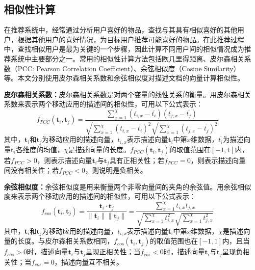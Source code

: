 \subsection{相似性计算}
在推荐系统中，经常通过分析用户喜好的物品，查找与其具有相似喜好的其他用户，根据其他用户的喜好情况，为目标用户推荐可能喜好的物品。在此推荐过程中，查找相似用户是最为关键的一个步骤，因此计算不同用户间的相似情况成为推荐系统中主要部分之一。常用的相似性计算方法包括欧几里得距离、皮尔森相关系数（PCC: Pearson Correlation Coefficient）\cite{pearson1895note}、余弦相似度（Cosine Similarity）等。本文分别使用皮尔森相关系数和余弦相似度对描述文档的向量计算相似性。

\textbf{皮尔森相关系数：}皮尔森相关系数是对两个变量的线性关系的衡量。用皮尔森相关系数来表示两个移动应用的描述间的相似性，可用以下公式表示：
\begin{equation}
f_{\mathit{PCC}}(\mathbf{t}_i, \mathbf{t}_j) 
= \frac{\sum_{x=1}^\chi (t_{i,x} - \overline{t_i})(t_{j,x} - \overline{t_j})}{\sqrt{\sum_{x=1}^\chi (t_{i,x} - \overline{t_i})^2}\sqrt{\sum_{x=1}^\chi (t_{j,x} - \overline{t_j})^2}}
\end{equation}
其中，$\mathbf{t}_i$和$\mathbf{t}_j$为移动应用的描述向量，$t_{i,x}$表示描述向量$\mathbf{t}_i$中第$x$维数据，$\overline{t_i}$为描述向量$\mathbf{t}_i$各维度的均值，$\chi$是描述向量的长度。$f_{\mathit{PCC}}(\mathbf{t}_i, \mathbf{t}_j)$的取值范围在$[-1,1]$内，若$f_{\mathit{PCC}}>0$，则表示描述向量$\mathbf{t}_i$与$\mathbf{t}_j$具有正相关性；若$f_{\mathit{PCC}}=0$，则表示描述向量间没有相关性；若$f_{\mathit{PCC}}<0$，则说明是负相关。

\textbf{余弦相似度：}余弦相似度是用来衡量两个非零向量间的夹角的余弦值。用余弦相似度来表示两个移动应用的描述间的相似性，可用以下公式表示：
\begin{equation}
f_{\mathit{cos}}(\mathbf{t}_i, \mathbf{t}_j) 
= \frac{\mathbf{t}_i \cdot \mathbf{t}_j}{\parallel \mathbf{t}_i \parallel \parallel \mathbf{t}_j \parallel}
= \frac{\sum_{x=1}^\chi t_{i,x}t_{j,x}}{\sqrt{\sum_{x=1}^\chi t_{i,x}^2}\sqrt{\sum_{x=1}^\chi t_{j,x}^2}}
\end{equation}
其中，$\mathbf{t}_i$和$\mathbf{t}_j$为移动应用的描述向量，$t_{i,x}$表示描述向量$\mathbf{t}_i$中第$x$维数据，$\chi$是描述向量的长度。与皮尔森相关系数相同，$f_{\mathit{cos}}(\mathbf{t}_i, \mathbf{t}_j)$的取值范围也在$[-1,1]$内，且当$f_{\mathit{cos}}>0$时，描述向量$\mathbf{t}_i$与$\mathbf{t}_j$呈现正相关性；当$f_{\mathit{cos}}<0$时，描述向量$\mathbf{t}_i$与$\mathbf{t}_j$呈现负相关性；当$f_{\mathit{cos}}=0$，描述向量互不相关。

